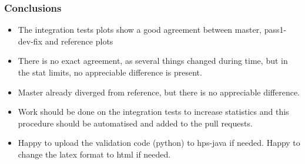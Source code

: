 \documentclass{beamer}
\begin{document}
\begin{frame}
\frametitle{Conclusions}
\begin{small}
\begin{itemize}
\item {The integration tests plots show a good agreement between master, pass1-dev-fix and reference plots}
\item {There is no exact agreement, as several things changed during time, but in the stat limits, no appreciable difference is present.}
\item {Master already diverged from reference, but there is no appreciable difference.}
\item {Work should be done on the integration tests to increase statistics and this procedure should be automatised and added to the pull requests.}
\item {Happy to upload the validation code (python) to hps-java if needed. Happy to change the latex format to html if needed.}
\end{itemize}
\end{small}
\end{frame}





\end{document}
